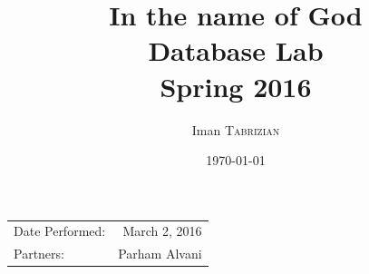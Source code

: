 \documentclass{article}
\title{In the name of God \\ Database Lab \\ Spring 2016} %
\author{Iman \textsc{Tabrizian}} %
\date{\today} %
\begin{document}
\maketitle %

\begin{center}
	\begin{tabular}{l r}
		Date Performed: & March 2, 2016 \\ %
		Partners: & Parham Alvani \\ %
	\end{tabular}
\end{center}


\end{document}
